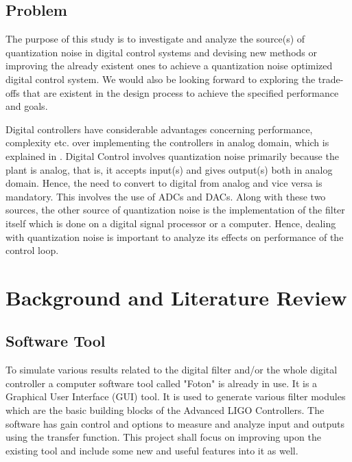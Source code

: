 \documentclass[colorlinks=true,pdfstartview=FitV,linkcolor=blue,
            citecolor=red,urlcolor=magenta]{ligodoc}
\begin{document}
\subsection{Problem}
The purpose of this study is to investigate and analyze the source(s) of quantization noise in digital control systems and devising new methods or improving the already existent ones to achieve a quantization noise optimized digital control system. We would also be looking forward to exploring the trade-offs that are existent in the design process to achieve the specified performance and goals. 

Digital controllers have considerable advantages concerning performance, complexity etc. over implementing the controllers in analog domain, which is explained in \cite{WhyDigital}. Digital Control involves quantization noise primarily because the plant is analog, that is, it accepts input(s) and gives output(s) both in analog domain. Hence, the need to convert to digital from analog and vice versa is mandatory. This involves the use of ADCs and DACs. Along with these two sources, the other source of quantization noise is the implementation of the filter itself which is done on a digital signal processor or a computer. Hence, dealing with quantization noise is important to analyze its effects on performance of the control loop.
\section{Background and Literature Review}
\subsection{Software Tool} To simulate various results related to the digital filter and/or the whole digital controller a computer software tool called "Foton" is already in use. It is a Graphical User Interface (GUI) tool. It is used to generate various filter modules which are the basic building blocks of the Advanced LIGO Controllers. The software has gain control and options to measure and analyze input and outputs using the transfer function. This project shall focus on improving upon the existing tool and include some new and useful features into it as well. 
\end{document}
